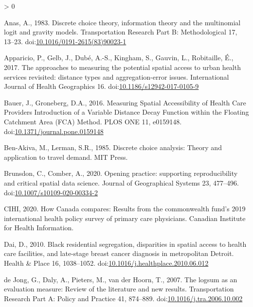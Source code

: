\documentclass[]{elsarticle} %
\newlength{\cslhangindent}
\newenvironment{CSLReferences}[2] %
 {%
  \setlength{\parindent}{0pt}
  \ifodd #1 \everypar{\setlength{\hangindent}{\cslhangindent}}\ignorespaces\fi
  \ifnum #2 > 0
  \setlength{\parskip}{#2\baselineskip}
  \fi
 }%
 {}
\begin{document}
\hypertarget{refs}{}
\begin{CSLReferences}{1}{0}
\leavevmode\hypertarget{ref-anas1983}{}%
Anas, A., 1983. Discrete choice theory, information theory and the
multinomial logit and gravity models. Transportation Research Part B:
Methodological 17, 13--23.
doi:\href{https://doi.org/10.1016/0191-2615(83)90023-1}{10.1016/0191-2615(83)90023-1}

\leavevmode\hypertarget{ref-apparicio2017}{}%
Apparicio, P., Gelb, J., Dubé, A.-S., Kingham, S., Gauvin, L.,
Robitaille, É., 2017. The approaches to measuring the potential spatial
access to urban health services revisited: distance types and
aggregation-error issues. International Journal of Health Geographics
16.
doi:\href{https://doi.org/10.1186/s12942-017-0105-9}{10.1186/s12942-017-0105-9}

\leavevmode\hypertarget{ref-bauer2016}{}%
Bauer, J., Groneberg, D.A., 2016. Measuring Spatial Accessibility of
Health Care Providers {{}} Introduction of a Variable Distance Decay
Function within the Floating Catchment Area (FCA) Method. PLOS ONE 11,
e0159148.
doi:\href{https://doi.org/10.1371/journal.pone.0159148}{10.1371/journal.pone.0159148}

\leavevmode\hypertarget{ref-ben1985}{}%
Ben-Akiva, M., Lerman, S.R., 1985. Discrete choice analysis: Theory and
application to travel demand. MIT Press.

\leavevmode\hypertarget{ref-brunsdon2020}{}%
Brunsdon, C., Comber, A., 2020. Opening practice: supporting
reproducibility and critical spatial data science. Journal of
Geographical Systems 23, 477--496.
doi:\href{https://doi.org/10.1007/s10109-020-00334-2}{10.1007/s10109-020-00334-2}

\leavevmode\hypertarget{ref-cihi2020}{}%
CIHI, 2020. How {Canada} compares: Results from the commonwealth fund's
2019 international health policy survey of primary care physicians.
Canadian Institute for Health Information.

\leavevmode\hypertarget{ref-dai2010}{}%
Dai, D., 2010. Black residential segregation, disparities in spatial
access to health care facilities, and late-stage breast cancer diagnosis
in metropolitan Detroit. Health \& Place 16, 1038--1052.
doi:\href{https://doi.org/10.1016/j.healthplace.2010.06.012}{10.1016/j.healthplace.2010.06.012}

\leavevmode\hypertarget{ref-dejong2007}{}%
de Jong, G., Daly, A., Pieters, M., van der Hoorn, T., 2007. The logsum
as an evaluation measure: Review of the literature and new results.
Transportation Research Part A: Policy and Practice 41, 874--889.
doi:\href{https://doi.org/10.1016/j.tra.2006.10.002}{10.1016/j.tra.2006.10.002}


\end{CSLReferences}
\end{document}
